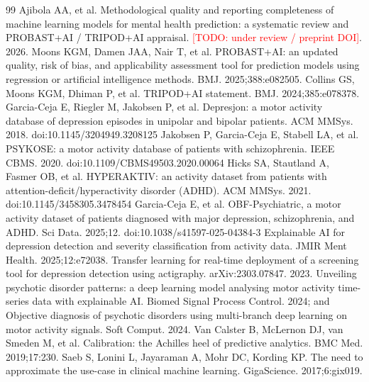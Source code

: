 \documentclass[11pt,a4paper]{article}
\newcommand{\todo}[1]{\textcolor{red}{[TODO: #1]}}
\begin{document}
\begin{thebibliography}{99}\footnotesize
{} Ajibola AA, et al. Methodological quality and reporting completeness of machine learning models for mental health prediction: a systematic review and PROBAST+AI / TRIPOD+AI appraisal. \todo{under review / preprint DOI}. 2026.
 Moons KGM, Damen JAA, Nair T, et al. PROBAST+AI: an updated quality, risk of bias, and applicability assessment tool for prediction models using regression or artificial intelligence methods. BMJ. 2025;388:e082505.
 Collins GS, Moons KGM, Dhiman P, et al. TRIPOD+AI statement. BMJ. 2024;385:e078378.
 Garcia-Ceja E, Riegler M, Jakobsen P, et al. Depresjon: a motor activity database of depression episodes in unipolar and bipolar patients. ACM MMSys. 2018. doi:10.1145/3204949.3208125
 Jakobsen P, Garcia-Ceja E, Stabell LA, et al. PSYKOSE: a motor activity database of patients with schizophrenia. IEEE CBMS. 2020. doi:10.1109/CBMS49503.2020.00064
 Hicks SA, Stautland A, Fasmer OB, et al. HYPERAKTIV: an activity dataset from patients with attention-deficit/hyperactivity disorder (ADHD). ACM MMSys. 2021. doi:10.1145/3458305.3478454
 Garcia-Ceja E, et al. OBF-Psychiatric, a motor activity dataset of patients diagnosed with major depression, schizophrenia, and ADHD. Sci Data. 2025;12. doi:10.1038/s41597-025-04384-3
 Explainable AI for depression detection and severity classification from activity data. JMIR Ment Health. 2025;12:e72038.
 Transfer learning for real-time deployment of a screening tool for depression detection using actigraphy. arXiv:2303.07847. 2023.
 Unveiling psychotic disorder patterns: a deep learning model analysing motor activity time-series data with explainable AI. Biomed Signal Process Control. 2024; and Objective diagnosis of psychotic disorders using multi-branch deep learning on motor activity signals. Soft Comput. 2024.
 Van Calster B, McLernon DJ, van Smeden M, et al. Calibration: the Achilles heel of predictive analytics. BMC Med. 2019;17:230.
 Saeb S, Lonini L, Jayaraman A, Mohr DC, Kording KP. The need to approximate the use-case in clinical machine learning. GigaScience. 2017;6:gix019.
\end{thebibliography}
\end{document}
